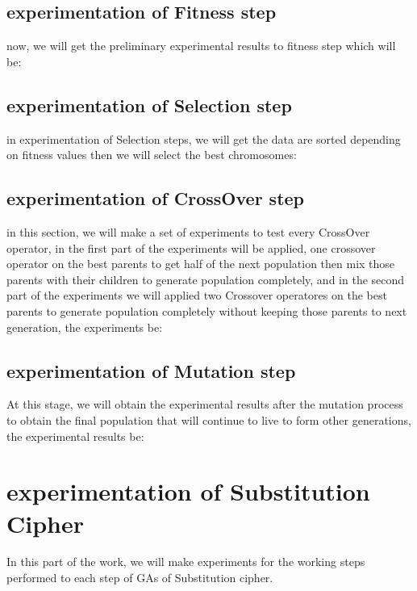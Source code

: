 \subsection{experimentation of Fitness step}
now, we will get the preliminary experimental results to fitness step which will be:\\


\newpage
\subsection{experimentation of Selection step}
in experimentation of Selection steps, we will get the data are sorted depending on fitness values then we will select the best chromosomes:


\newpage
\subsection{experimentation of CrossOver step}
in this section, we will make a set of experiments to test every CrossOver operator, in the first part of the experiments will be applied, one crossover operator on the best parents to get half of the next population then mix those parents with their children to generate population completely, and in the second part of the experiments we will applied two Crossover operatores on the best parents  to generate population completely without keeping those parents to next generation, the experiments be:\\


\newpage
\subsection{experimentation of Mutation step}
At this stage, we will obtain the experimental results after the mutation process to obtain the final population that will continue to live to form other generations, the experimental results be:\\


\newpage


\section{experimentation of Substitution Cipher}
In this part of the work, we will make experiments for the working steps performed to each step of GAs of Substitution cipher.
